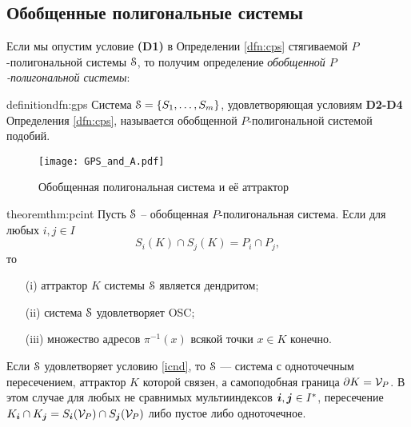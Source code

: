 \subsection{Обобщенные полигональные системы}



Если мы опустим условие {\bf(D1)} в Определении \ref{dfn:cps} стягиваемой $P$-полигональной системы ${\EuScript S}$, то получим определение {\em обобщенной $P$-полигональной системы}:

\begin{restatethis}{definition}{dfn:gps} \label{dfn:gps}
Система ${\EuScript S}=\{S_1,\ldots ,S_m\} $, удовлетворяющая условиям {\bf D2-D4} Определения \ref{dfn:cps}, называется обобщенной $P$-полигональной системой подобий.    
\end{restatethis}



\begin{figure}[H]
    \centering
    \texttt{[image: GPS\_and\_A.pdf]}
    \caption{Обобщенная полигональная система и её аттрактор}
    \label{img:ops}
\end{figure}
\begin{restatethis}{theorem}{thm:pcint}\label{thm:pcint}
Пусть ${\EuScript S}$ --  обобщенная $P$-полигональная система.  
Если для любых $i, j \in I$ 
\begin{equation}\label{icnd}
S_i(K)\cap S_j(K)=P_i\cap P_j,
\end{equation} 
то 
\begin{itemize}[nolistsep]
    \item[(i)] аттрактор $K$ системы ${\EuScript S}$ является дендритом;
    \item[(ii)] система ${\EuScript S}$ удовлетворяет OSC;
    \item[(iii)] множество адресов $\pi^{-1}(x)$ всякой точки $x\in K$ конечно.
\end{itemize}
   
\end{restatethis}


\begin{remark}\label{fpro} 
Если ${\EuScript S}$ удовлетворяет условию \eqref{icnd}, то ${\EuScript S}$ --- система с одноточечным пересечением, аттрактор $K$ которой связен, а самоподобная граница $\partial K={\mathcal V}_P$. 
В этом случае для любых не сравнимых мультииндексов ${\bm{i}},{\bm{j}}\in I^*$, пересечение $K_{\bm{i}}\cap K_{\bm{j}}=S_{\bm{i}}({\mathcal V}_P)\cap S_{\bm{j}}({\mathcal V}_P)$ либо пустое либо одноточечное.
\end{remark}

